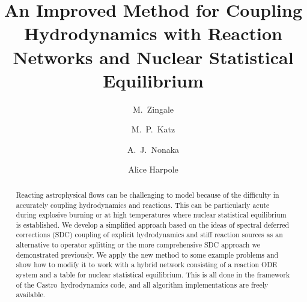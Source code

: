 \documentclass[times,modern]{aastex63}
\newcommand{\castro}{{\sf Castro}}
\begin{document}
\title{An Improved Method for Coupling Hydrodynamics with Reaction Networks and Nuclear Statistical Equilibrium}



\shortauthors{}

\author[0000-0001-8401-030X]{M.~Zingale}

\author[0000-0003-0439-4556]{M.~P.~Katz}

\author[0000-0003-1791-0265]{A.~J.~Nonaka}

\author[0000-0002-1530-781X]{Alice Harpole}



\begin{abstract}
Reacting astrophysical flows can be challenging to model because of
the difficulty in accurately coupling hydrodynamics and reactions.
This can be particularly acute during explosive burning or at high
temperatures where nuclear statistical equilibrium is established.  We
develop a simplified approach based on the ideas of spectral deferred
corrections (SDC) coupling of explicit hydrodynamics and stiff
reaction sources as an alternative to operator splitting or the more
comprehensive SDC approach we demonstrated previously.  We apply the
new method to some example problems and show how to modify it to work
with a hybrid network consisting of a reaction ODE system and a table
for nuclear statistical equilibrium.  This is all done in the
framework of the \castro\ hydrodynamics code, and all algorithm
implementations are freely available.
\end{abstract}
\end{document}
